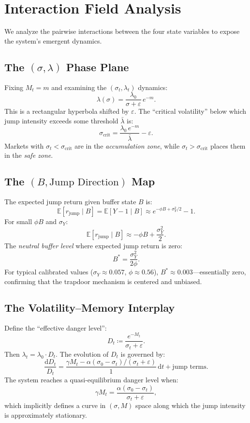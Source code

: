 \documentclass[11pt,a4paper]{article}
\newcommand{\E}{\mathbb{E}}
\newcommand{\diff}{\mathrm{d}}
\newcommand{\dt}{\diff t}
\begin{document}
\section{Interaction Field Analysis}
\label{sec:field}

We analyze the pairwise interactions between the four state variables
to expose the system's emergent dynamics.

\subsection{The $(\sigma, \lambda)$ Phase Plane}

Fixing $M_t = m$ and examining the $(\sigma_t, \lambda_t)$ dynamics:
\[
  \lambda(\sigma) = \frac{\lambda_0}{\sigma + \varepsilon}\, e^{-m}.
\]
This is a rectangular hyperbola shifted by $\varepsilon$. The
``critical volatility'' below which jump intensity exceeds some threshold
$\bar{\lambda}$ is:
\[
  \sigma_{\text{crit}} = \frac{\lambda_0\, e^{-m}}{\bar{\lambda}} - \varepsilon.
\]
Markets with $\sigma_t < \sigma_{\text{crit}}$ are in the
\emph{accumulation zone}, while $\sigma_t > \sigma_{\text{crit}}$ places
them in the \emph{safe zone}.

\subsection{The $(B, \text{Jump Direction})$ Map}

The expected jump return given buffer state $B$ is:
\[
  \E[r_{\text{jump}} \mid B] = \E[Y - 1 \mid B] \approx e^{-\phi B + \sigma_Y^2/2} - 1.
\]
For small $\phi B$ and $\sigma_Y$:
\[
  \E[r_{\text{jump}} \mid B] \approx -\phi B + \frac{\sigma_Y^2}{2}.
\]
The \emph{neutral buffer level} where expected jump return is zero:
\[
  B^* = \frac{\sigma_Y^2}{2\phi}.
\]
For typical calibrated values ($\sigma_Y \approx 0.057$, $\phi \approx 0.56$),
$B^* \approx 0.003$---essentially zero, confirming that the trapdoor
mechanism is centered and unbiased.

\subsection{The Volatility--Memory Interplay}

Define the ``effective danger level'':
\[
  D_t \coloneqq \frac{e^{-M_t}}{\sigma_t + \varepsilon}.
\]
Then $\lambda_t = \lambda_0 \cdot D_t$. The evolution of $D_t$ is
governed by:
\[
  \frac{\diff D_t}{D_t} = \frac{\gamma M_t - \alpha(\sigma_0 - \sigma_t)/(\sigma_t + \varepsilon)}{1}\,\dt
  + \text{jump terms}.
\]
The system reaches a quasi-equilibrium danger level when:
\[
  \gamma M_t = \frac{\alpha(\sigma_0 - \sigma_t)}{\sigma_t + \varepsilon},
\]
which implicitly defines a curve in $(\sigma, M)$ space along which the
jump intensity is approximately stationary.
\end{document}
